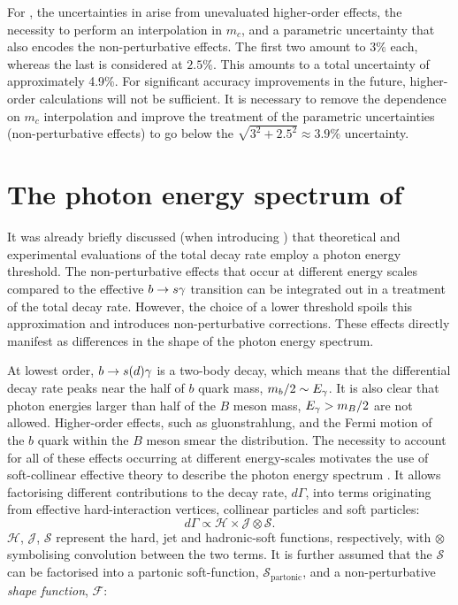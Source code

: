 For \BtoXsgamma, the uncertainties in  arise from unevaluated higher-order effects, the necessity to perform an interpolation in $m_c$, and a parametric uncertainty that also encodes the non-perturbative effects.
The first two amount to $3\%$ each, whereas the last is considered at $2.5\%$. 
This amounts to a total uncertainty of approximately 4.9\%.
For significant accuracy improvements in the future, higher-order calculations will not be sufficient.
It is necessary to remove the dependence on $m_c$ interpolation and improve the treatment of the parametric uncertainties (non-perturbative effects) to go below the $\sqrt{3^2+2.5^2}\approx3.9\%$ uncertainty.

\section{The photon energy spectrum of \texorpdfstring{\BtoXsdgamma}{B->Xsg}}\label{sec:btosgamma_spectrum_theory}

It was already briefly discussed (when introducing ) that theoretical and experimental evaluations of the total \BtoXsgamma decay rate employ a photon energy threshold.
The non-perturbative effects that occur at different energy scales compared to the effective $b\rightarrow s\gamma$ transition can be integrated out in a treatment of the total decay rate.
However, the choice of a lower threshold spoils this approximation and introduces non-perturbative corrections.
These effects directly manifest as differences in the shape of the photon energy spectrum.

At lowest order, $b\rightarrow s(d) \gamma$ is a two-body decay, which means that the differential decay rate peaks near the half of $b$ quark mass, $m_b/2\sim E_{\gamma}$.
It is also clear that photon energies larger than half of the $B$ meson mass, $E_{\gamma}>m_B/2$ are not allowed.
Higher-order effects, such as gluonstrahlung, and the Fermi motion of the $b$ quark within the $B$ meson smear the distribution.
The necessity to account for all of these effects occurring at different energy-scales motivates the use of soft-collinear effective theory to describe the \BtoXsgamma photon energy spectrum \cite{Neubert:2004qw,Ligeti:2008ac}.
It allows factorising different contributions to the decay rate, $d\Gamma$, into terms originating from effective hard-interaction vertices, collinear particles and soft particles:
\begin{equation}\label{eq:differential_decay_rate_SCET}
    d\Gamma \propto \mathcal{H} \times \mathcal{J} \otimes \mathcal{S}.
\end{equation}
$\mathcal{H}$, $\mathcal{J}$, $\mathcal{S}$ represent the hard, jet and hadronic-soft functions, respectively, with $\otimes$ symbolising convolution between the two terms.
It is further assumed that the $\mathcal{S}$ can be factorised into a partonic soft-function, $\mathcal{S}_{\mathrm{partonic}}$, and a non-perturbative \textit{shape function}, $\mathcal{F}$:

